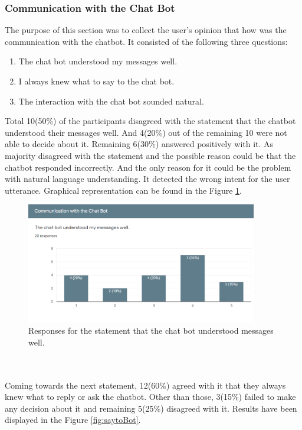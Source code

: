 \subsubsection*{Communication with the Chat Bot}
The purpose of this section was to collect the user's opinion that how was the communication with the chatbot. It consisted of the following three questions:
\begin{enumerate}
    \item The chat bot understood my messages well.
    \item I always knew what to say to the chat bot.
    \item The interaction with the chat bot sounded natural.
\end{enumerate}
Total 10(50\%) of the participants disagreed with the statement that the chatbot understood their messages well. And 4(20\%) out of the remaining 10 were not able to decide about it. Remaining 6(30\%) answered positively with it. As majority disagreed with the statement and the possible reason could be that the chatbot responded incorrectly. And the only reason for it could be the problem with natural language understanding. It detected the wrong intent for the user utterance. Graphical representation can be found in the Figure \ref{fig:understWell}.

\begin{figure}[!h]
    \centering
    \includegraphics[width=0.9\textwidth]{img/Underst_Well.PNG}
    \caption{Responses for the statement that the chat bot understood messages well.}
    \label{fig:understWell}
\end{figure}
\\~\\
Coming towards the next statement, 12(60\%) agreed with it that they always knew what to reply or ask the chatbot. Other than those, 3(15\%) failed to make any decision about it and remaining 5(25\%) disagreed with it. Results have been displayed in the Figure \ref{fig:saytoBot}.

